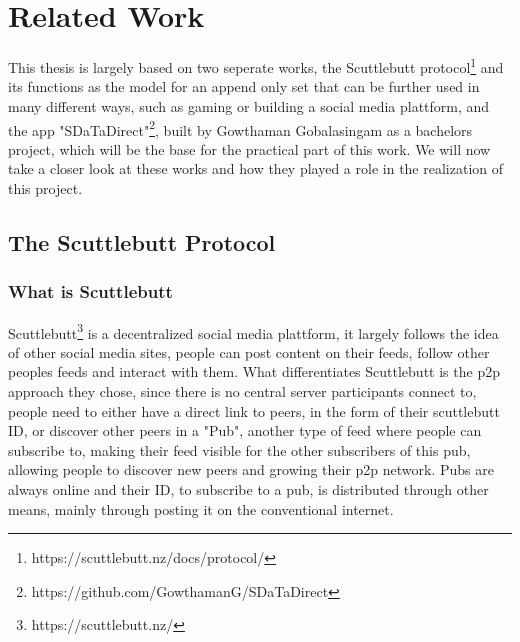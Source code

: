 \chapter{Related Work}

This thesis is largely based on two seperate works, the Scuttlebutt protocol\footnote{https://scuttlebutt.nz/docs/protocol/} and its functions as the model for an append only set that can be further used in many different ways, such as gaming or building a social media plattform, and the app "SDaTaDirect"\footnote{https://github.com/GowthamanG/SDaTaDirect}, built by Gowthaman Gobalasingam as a bachelors project, which will be the base for the practical part of this work. We will now take a closer look at these works and how they played a role in the realization of this project.

\section{The Scuttlebutt Protocol}
\label{sec:the_scuttlebutt_protocol}
\subsection{What is Scuttlebutt}
Scuttlebutt\footnote{https://scuttlebutt.nz/} is a decentralized social media plattform, it largely follows the idea of other social media sites, people can post content on their feeds, follow other peoples feeds and interact with them. What differentiates Scuttlebutt is the p2p approach they chose, since there is no central server participants connect to, people need to either have a direct link to peers, in the form of their scuttlebutt ID, or discover other peers in a "Pub", another type of feed where people can subscribe to, making their feed visible for the other subscribers of this pub, allowing people to discover new peers and growing their p2p network. Pubs are always online and their ID, to subscribe to a pub, is distributed through other means, mainly through posting it on the conventional internet.

